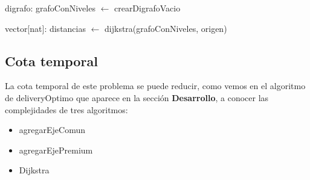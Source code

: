\par
\begin{algorithm}[H]
		\NoCaptionOfAlgo
		\caption{}	
		digrafo: grafoConNiveles $\leftarrow$ crearDigrafoVacio\\
		
	
		vector[nat]: distancias $\leftarrow$ dijkstra(grafoConNiveles, origen)\\

	\end{algorithm}


\subsection{Cota temporal}
La cota temporal de este problema se puede reducir, como vemos en el algoritmo de deliveryOptimo que aparece en la sección \textbf{Desarrollo}, a conocer las complejidades de tres algoritmos:
\begin{itemize}
\item agregarEjeComun
\item agregarEjePremium
\item Dijkstra
\end{itemize}

